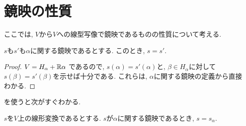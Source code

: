\section{鏡映の性質}
ここでは, $V$から$V$への線型写像で鏡映であるものの性質について考える.
\begin{lemma}
  \label{lemma:reflisunique}
  $s$も$s'$も$\alpha$に関する鏡映であるとする.
  このとき, $s=s'$.
\end{lemma}
\begin{proof}
  $V =   H_\alpha +  \mathbb{R}\alpha$
  であるので,
  $s(\alpha)=s'(\alpha)$と,
  $\beta\in H_\alpha$に対して
  $s(\beta)=s'(\beta)$を示せば十分である.
  これらは,
  $\alpha$に関する鏡映の定義から直接わかる.
\end{proof}
を使うと次がすぐわかる.
\begin{prop}
  $s$を$V$上の線形変換であるとする.
  $s$が$\alpha$に関する鏡映であるとき, $s=s_\alpha$.
\end{prop}

